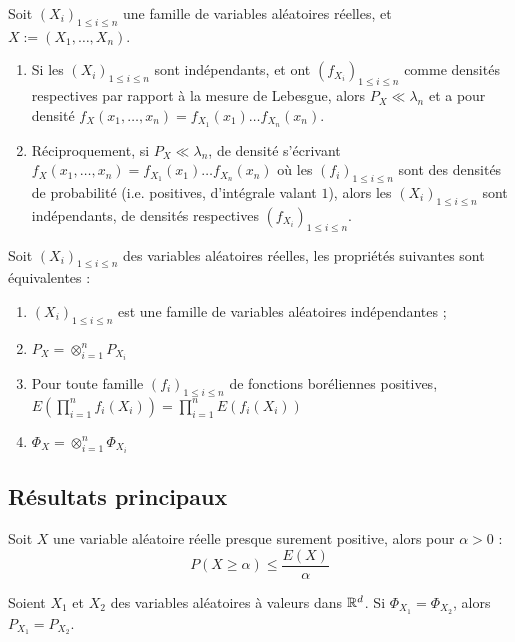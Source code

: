 \documentclass[11pt,a4paper]{article}
\begin{document}
\begin{propstar}
 Soit $(X_i)_{ 1 \leq i \leq n}$ une famille de variables aléatoires réelles, et $X:=(X_1,\dots,X_n)$. 
\begin{enumerate}
\item Si les $(X_i)_{ 1 \leq i \leq n}$ sont indépendants, et ont $(f_{X_i})_{1\leq i \leq n}$ comme densités respectives par rapport à la mesure de Lebesgue, alors $P_X \ll \lambda_n$ et a pour densité $f_X(x_1,\dots,x_n)=f_{X_1}(x_1)\dots f_{X_n}(x_n)$.
\item Réciproquement, si $P_X \ll \lambda_n$, de densité s'écrivant $f_X(x_1,\dots,x_n)=f_{X_1}(x_1)\dots f_{X_n}(x_n)$ où les $(f_i)_{1\leq i \leq n}$ sont des densités de probabilité (i.e. positives, d'intégrale valant $1$), alors les $(X_i)_{ 1 \leq i \leq n}$ sont indépendants, de densités respectives $(f_{X_i})_{1\leq i \leq n}$.
\end{enumerate}
\end{propstar}

\begin{corstar} Soit $(X_i)_{ 1 \leq i \leq n}$ des variables aléatoires réelles, les propriétés suivantes sont équivalentes :
\begin{enumerate}
\item  $(X_i)_{ 1 \leq i \leq n}$ est une famille de variables aléatoires indépendantes ; 
\item $P_X=\otimes_{i=1}^n P_{X_i}$
\item Pour toute famille $(f_i)_{1\leq i \leq n}$ de fonctions boréliennes positives, $\displaystyle E\left(\prod_{i=1}^n f_i(X_i)\right) = \prod_{i=1}^n E\left(f_i(X_i)\right)$
\item $\Phi_X=\otimes_{i=1}^n \Phi_{X_i}$
\end{enumerate}
\end{corstar}

\subsection*{Résultats principaux}

\begin{thmstar}
 Soit $X$ une variable aléatoire réelle presque surement positive, alors pour $\alpha>0$ : \[P(X \geq \alpha) \leq \frac{E(X)}{\alpha}\]
\end{thmstar}

\begin{thmstar}
Soient $X_1$ et $X_2$ des variables aléatoires à valeurs dans $\mathbb R^d$. Si $\Phi_{X_1}=\Phi_{X_2}$, alors $P_{X_1}=P_{X_2}$.
\end{thmstar}
\end{document}
